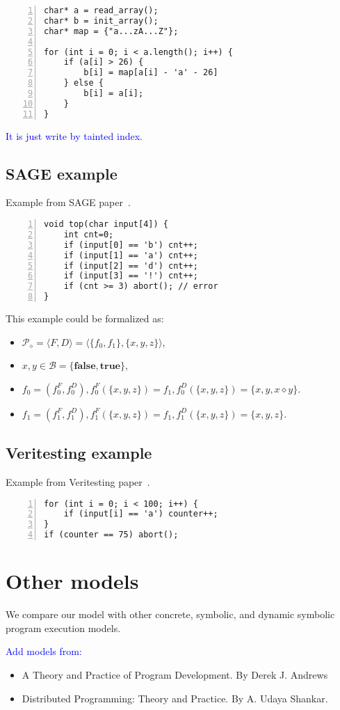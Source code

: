 \documentclass[fleqn,oneside,a4]{article}
\newcommand{\level}{\section}
\newcommand{\sublevel}{\subsection}
\newcommand{\comment}[1]{\textcolor{blue}{#1}}  %
\newcommand{\true}{\textbf{true}}
\newcommand{\false}{\textbf{false}}
\begin{document}
\begin{lstlisting}[numbers=left,numberstyle=\scriptsize]
char* a = read_array();
char* b = init_array();
char* map = {"a...zA...Z"};

for (int i = 0; i < a.length(); i++) {
    if (a[i] > 26) {
        b[i] = map[a[i] - 'a' - 26]
    } else {
        b[i] = a[i];
    }
}
\end{lstlisting}

\comment{It is just write by tainted index.}

\sublevel{SAGE example}

Example from SAGE paper~\cite{sage}.
\begin{lstlisting}[numbers=left,numberstyle=\scriptsize]
void top(char input[4]) {
    int cnt=0;
    if (input[0] == 'b') cnt++;
    if (input[1] == 'a') cnt++;
    if (input[2] == 'd') cnt++;
    if (input[3] == '!') cnt++;
    if (cnt >= 3) abort(); // error
}
\end{lstlisting}

This example could be formalized as:
\begin{itemize}
    \item $\mathcal{P}_{\diamond} = \langle F, D \rangle =
        \langle \{f_0, f_1\}, \{x, y, z\} \rangle$,
    \item $x, y \in \mathcal{B} = \{\false, \true\}$,
    \item $f_0 = (f^F_0, f^D_0), f^F_0(\{x, y, z\}) = f_1,
        f^D_0(\{x, y, z\}) = \{x, y, x \diamond y\}$.
    \item $f_1 = (f^F_1, f^D_1), f^F_1(\{x, y, z\}) = f_1,
        f^D_1(\{x, y, z\}) = \{x, y, z\}$.
\end{itemize}

\sublevel{Veritesting example}

Example from Veritesting paper~\cite{veritesting}.
\begin{lstlisting}[numbers=left,numberstyle=\scriptsize]
for (int i = 0; i < 100; i++) {
    if (input[i] == 'a') counter++;
}
if (counter == 75) abort();
\end{lstlisting}

\level{Other models}

We compare our model with other concrete, symbolic, and dynamic symbolic
program execution models.

\comment{Add models from:}
\begin{itemize}
    \item A Theory and Practice of Program Development.
        By Derek J. Andrews
    \item Distributed Programming: Theory and Practice.
        By A. Udaya Shankar.
\end{itemize}
\end{document}
